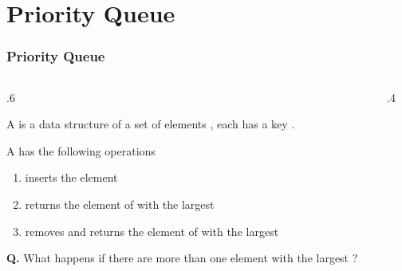 \documentclass[10pt]{beamer}
\begin{document}
\section{Priority Queue}
\begin{frame}[t]\frametitle{Priority Queue}

	\vspace{-0.5cm}
	\begin{columns}[T] %
	\begin{column}{.6\linewidth} %
		\begin{definition}[Mathematical]
			A   is a data structure of 
			a set  of elements ,
			each has a key .
			
			A  has the following operations
			\begin{enumerate}
			
				\item 
				inserts the element 
				
				\item 
				 returns the element of  
				with the largest 
				
				\item 
				 removes and returns the element of  
				with the largest 
			\end{enumerate}			
		\end{definition}
		
		\textbf{Q.}
		What happens if there are more than one element with  the largest ?
		
	\end{column} %
	\begin{column}{.4\linewidth} %
		\begin{example}
		{\scriptsize
%			
		} %
		\end{example}

	\end{column} %
	\end{columns} %
\end{frame}




\end{document}
